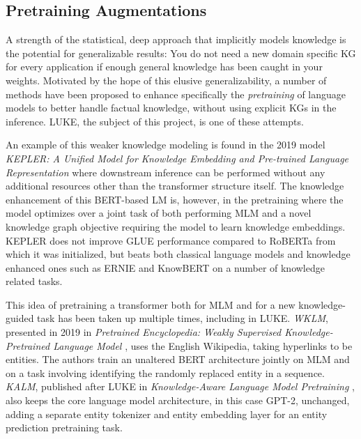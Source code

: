 \documentclass[main.tex]{subfiles}
\begin{document}
\subsection{Pretraining Augmentations}
A strength of the statistical, deep approach that implicitly models knowledge is the potential for generalizable results:
You do not need a new domain specific KG for every application if enough general knowledge has been caught in your weights.
Motivated by the hope of this elusive generalizability, a number of methods have been proposed to enhance specifically the \emph{pretraining} of language models to better handle factual knowledge, without using explicit KGs in the inference.
LUKE, the subject of this project, is one of these attempts.

An example of this weaker knowledge modeling is found in the 2019 model \emph{KEPLER: A Unified Model for Knowledge Embedding and Pre-trained Language Representation} \cite{wang2021kepler} where downstream inference can be performed without any additional resources other than the transformer structure itself.
The knowledge enhancement of this BERT-based LM is, however, in the pretraining where the model optimizes over a joint task of both performing MLM and a novel knowledge graph objective requiring the model to learn knowledge embeddings.
KEPLER does not improve GLUE performance compared to RoBERTa \cite{liu2019roberta} from which it was initialized, but beats both classical language models and knowledge enhanced ones such as ERNIE and KnowBERT on a number of knowledge related tasks.

This idea of pretraining a transformer both for MLM and for a new knowledge-guided task has been taken up multiple times, including in LUKE.
\emph{WKLM}, presented in 2019 in \emph{Pretrained Encyclopedia: Weakly Supervised Knowledge-Pretrained Language Model} \cite{xiong2019wklm}, uses the English Wikipedia, taking hyperlinks to be entities.
The authors train an unaltered BERT architecture jointly on MLM and on a task involving identifying the randomly replaced entity in a sequence.
\emph{KALM}, published after LUKE in \emph{Knowledge-Aware Language Model Pretraining} \cite{corby2020kalm}, also keeps the core language model architecture, in this case GPT-2, unchanged, adding a separate entity tokenizer and entity embedding layer for an entity prediction pretraining task.
\end{document}

